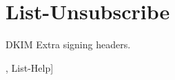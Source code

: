 \hypertarget{List-Unsubscribe-example}{}\section{List-\/\+Unsubscribe}
D\+K\+IM Extra signing headers.

\textquotesingle{}, \textquotesingle{}List-\/\+Help\textquotesingle{}\mbox{]}


\begin{DoxyCodeInclude}
\end{DoxyCodeInclude}
 